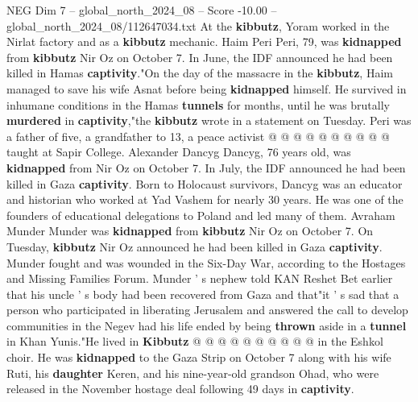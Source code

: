 \begin{textsample}{NEG Dim 7 – global\_north\_2024\_08 – Score -10.00 – global\_north\_2024\_08/112647034.txt}
At the \textbf{kibbutz}, Yoram worked in the Nirlat factory and as a \textbf{kibbutz} mechanic.
Haim Peri Peri, 79, was \textbf{kidnapped} from \textbf{kibbutz} Nir Oz on October 7.
In June, the IDF announced he had been killed in Hamas \textbf{captivity}."On the day of the massacre in the \textbf{kibbutz}, Haim managed to save his wife Asnat before being \textbf{kidnapped} himself.
He survived in inhumane conditions in the Hamas \textbf{tunnels} for months, until he was brutally \textbf{murdered} in \textbf{captivity},"the \textbf{kibbutz} wrote in a statement on Tuesday.
Peri was a father of five, a grandfather to 13, a peace activist @ @ @ @ @ @ @ @ @ @ taught at Sapir College.
Alexander Dancyg Dancyg, 76 years old, was \textbf{kidnapped} from Nir Oz on October 7.
In July, the IDF announced he had been killed in Gaza \textbf{captivity}.
Born to Holocaust survivors, Dancyg was an educator and historian who worked at Yad Vashem for nearly 30 years.
He was one of the founders of educational delegations to Poland and led many of them.
Avraham Munder Munder was \textbf{kidnapped} from \textbf{kibbutz} Nir Oz on October 7.
On Tuesday, \textbf{kibbutz} Nir Oz announced he had been killed in Gaza \textbf{captivity}.
Munder fought and was wounded in the Six-Day War, according to the Hostages and Missing Families Forum.
Munder ' s nephew told KAN Reshet Bet earlier that his uncle ' s body had been recovered from Gaza and that"it ' s sad that a person who participated in liberating Jerusalem and answered the call to develop communities in the Negev had his life ended by being \textbf{thrown} aside in a \textbf{tunnel} in Khan Yunis."He lived in \textbf{Kibbutz} @ @ @ @ @ @ @ @ @ @ in the Eshkol choir.
He was \textbf{kidnapped} to the Gaza Strip on October 7 along with his wife Ruti, his \textbf{daughter} Keren, and his nine-year-old grandson Ohad, who were released in the November hostage deal following 49 days in \textbf{captivity}.

\end{textsample}
